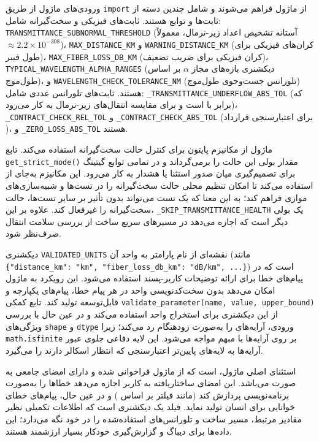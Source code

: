 ورودی‌های ماژول از طریق \texttt{import} از ماژول  فراهم می‌شوند و شامل چندین دسته از ثابت‌ها و توابع هستند. ثابت‌های فیزیکی و سخت‌گیرانه شامل: \texttt{TRANSMITTANCE\_SUBNORMAL\_THRESHOLD} (آستانه تشخیص اعداد زیر-نرمال، معمولاً $\approx 2.2 \times 10^{-308}$)، \texttt{MAX\_DISTANCE\_KM} و \texttt{WARNING\_DISTANCE\_KM} (کران‌های فیزیکی برای طول فیبر)، \texttt{MAX\_FIBER\_LOSS\_DB\_KM} (کران فیزیکی برای ضریب تضعیف)، \texttt{TYPICAL\_WAVELENGTH\_ALPHA\_RANGES} (دیکشنری بازه‌های مجاز $\alpha$ بر اساس طول‌موج)، و \texttt{WAVELENGTH\_CHECK\_TOLERANCE\_NM} (تلورانس جست‌وجوی طول‌موج) هستند. ثابت‌های تلورانس عددی شامل: \texttt{\_TRANSMITTANCE\_UNDERFLOW\_ABS\_TOL} (که برابر با  است و برای مقایسه انتقال‌های زیر-نرمال به کار می‌رود)، \texttt{\_CONTRACT\_CHECK\_REL\_TOL} و \texttt{\_CONTRACT\_CHECK\_ABS\_TOL} (برای اعتبارسنجی قرارداد )، و \texttt{\_ZERO\_LOSS\_ABS\_TOL} هستند.

ماژول از مکانیزم  پایتون برای کنترل حالت سخت‌گیرانه استفاده می‌کند. تابع \texttt{get\_strict\_mode()} مقدار بولی این حالت را برمی‌گرداند و در تمامی توابع گیتینگ برای تصمیم‌گیری میان صدور استثنا یا هشدار به کار می‌رود. این مکانیزم به‌جای  از  استفاده می‌کند تا امکان تنظیم محلی  حالت سخت‌گیرانه را در تست‌ها و شبیه‌سازی‌های موازی فراهم کند؛ به این معنا که یک تست می‌تواند بدون تأثیر بر سایر تست‌ها، حالت سخت‌گیرانه را غیرفعال کند. علاوه بر این، \texttt{\_SKIP\_TRANSMITTANCE\_HEALTH} یک  بولی دیگر است که اجازه می‌دهد در مسیرهای سریع ساخت  از بررسی سلامت انتقال صرف‌نظر شود.

دیکشنری \texttt{VALIDATED\_UNITS} نقشه‌ای از نام پارامتر به واحد آن (مانند \texttt{\{"distance\_km": "km", "fiber\_loss\_db\_km": "dB/km", ...\}}) است که در پیام‌های خطا برای ارائه توضیحات کاربر-پسند استفاده می‌شود. این رویکرد به ماژول امکان می‌دهد بدون سخت‌کدنویسی واحد در هر پیام خطا، پیام‌های یکپارچه و قابل‌توسعه تولید کند. تابع کمکی \texttt{validate\_parameter(name, value, upper\_bound)} از این دیکشنری برای استخراج واحد استفاده می‌کند و در عین حال با بررسی ویژگی‌های \texttt{shape} و \texttt{dtype} ورودی، آرایه‌های  را به‌صورت زودهنگام رد می‌کند؛ زیرا \texttt{math.isfinite} بر روی آرایه‌ها با  مبهم مواجه می‌شود. این لایه دفاعی جلوی عبور آرایه‌ها به لایه‌های پایین‌تر اعتبارسنجی که انتظار اسکالر دارند را می‌گیرد.

استثنای اصلی ماژول،  است که از ماژول  فراخوانی شده و دارای امضای جامعی به صورت  می‌باشد. این امضای ساختاریافته به کاربر اجازه می‌دهد خطاها را به‌صورت برنامه‌نویسی پردازش کند (مانند فیلتر بر اساس ) و در عین حال، پیام‌های خطای خوانایی برای انسان تولید نماید. فیلد  یک دیکشنری است که اطلاعات تکمیلی نظیر مقادیر مرتبط، مسیر ساخت و تلورانس‌های استفاده‌شده را در خود نگه می‌دارد؛ این داده‌ها برای دیباگ و گزارش‌گیری خودکار بسیار ارزشمند هستند.



